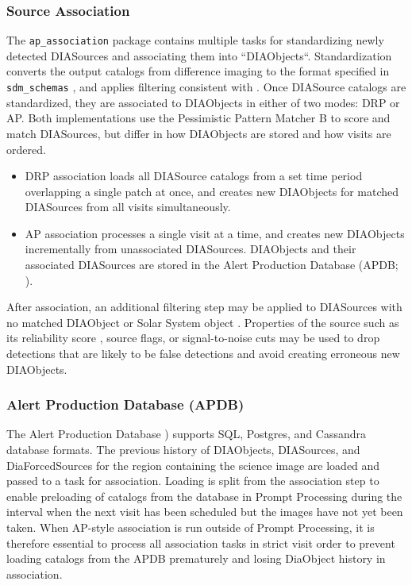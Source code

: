 

\subsubsection{Source Association}
\label{sec:association}

The \texttt{ap\_association} package contains multiple tasks for standardizing newly detected DIASources and associating them into ``DIAObjects``.
Standardization converts the output catalogs from difference imaging to the format specified in \texttt{sdm\_schemas} , and applies filtering consistent with \citep{DMTN-199}.
Once DIASource catalogs are standardized, they are associated to DIAObjects in either of two modes: DRP or AP.
Both implementations use the Pessimistic Pattern Matcher B \citep{DMTN-031} to score and match DIASources, but differ in how DIAObjects are stored and how visits are ordered.

\begin{itemize}
\item DRP association loads all DIASource catalogs from a set time period overlapping a single patch at once, and creates new DIAObjects for matched DIASources from all visits simultaneously.
\item AP association processes a single visit at a time, and creates new DIAObjects incrementally from unassociated DIASources.
DIAObjects and their associated DIASources are stored in the Alert Production Database (APDB; ).
\end{itemize}

After association, an additional filtering step may be applied to DIASources with no matched DIAObject or Solar System object .
Properties of the source such as its reliability score , source flags, or signal-to-noise cuts may be used to drop detections that are likely to be false detections and avoid creating erroneous new DIAObjects.

\subsubsection{Alert Production Database (APDB)}
\label{sec:apdb}

The Alert Production Database \citep[APDB;][]{DMTN-293}) supports SQL, Postgres, and Cassandra database formats.
The previous history of DIAObjects, DIASources, and DiaForcedSources for the region containing the science image are loaded and passed to a task for association.
Loading is split from the association step to enable preloading of catalogs from the database in Prompt Processing during the interval when the next visit has been scheduled but the images have not yet been taken.
When AP-style association is run outside of Prompt Processing, it is therefore essential to process all association tasks in strict visit order to prevent loading catalogs from the APDB prematurely and losing DiaObject history in association.

